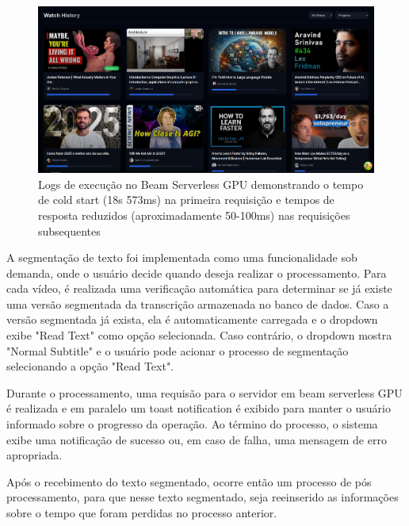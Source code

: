 \documentclass[tcc,capa]{texufpel}
\begin{document}
\begin{figure}[H]
  \centering
  \includegraphics[width=\textwidth,height=0.45\textheight,keepaspectratio]{exemplo-slides/graphics/images/watch history.png}
  \caption{Logs de execução no Beam Serverless GPU demonstrando o tempo de cold start (18s 573ms) na primeira requisição e tempos de resposta reduzidos (aproximadamente 50-100ms) nas requisições subsequentes}
  \label{fig:beam_logs_cold_start}
\end{figure}








A segmentação de texto foi implementada como uma funcionalidade sob demanda, onde o usuário decide quando deseja realizar o processamento. Para cada vídeo, é realizada uma verificação automática para determinar se já existe uma versão segmentada da transcrição armazenada no banco de dados. Caso a versão segmentada já exista, ela é automaticamente carregada e o dropdown exibe "Read Text" como opção selecionada. Caso contrário, o dropdown mostra "Normal Subtitle" e o usuário pode acionar o processo de segmentação selecionando a opção "Read Text".


Durante o processamento, uma requisão para o servidor em beam serverless GPU é realizada e em paralelo um toast notification é exibido para manter o usuário informado sobre o progresso da operação. Ao término do processo, o sistema exibe uma notificação de sucesso ou, em caso de falha, uma mensagem de erro apropriada.

Após o recebimento do texto segmentado, ocorre então um processo de pós processamento, para que nesse texto segmentado, seja reeinserido as informações sobre o tempo que foram perdidas no processo anterior.
\end{document}
